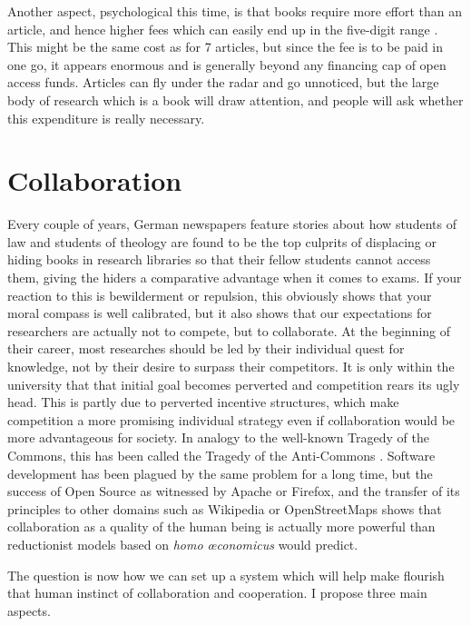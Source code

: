 \documentclass[12pt]{article}
\begin{document}
 Another aspect, psychological this time, is that books require more effort than an article, and hence higher fees which can easily end up in the five-digit range \citep{MaronEtAl2016}. This might be the same cost as for 7 articles, but since the fee is to be paid in one go, it appears enormous and is generally beyond any financing cap of open access funds. Articles can fly under the radar and go unnoticed, but the large body of research which is a book will draw attention, and people will ask whether this expenditure is really necessary. 
 
\section{Collaboration}
Every couple of years, German newspapers feature stories about how students of law and students of theology are found to be the top culprits of displacing or hiding books in research libraries so that their fellow students cannot access them, giving the hiders a comparative advantage when it comes to exams. If your reaction to this is bewilderment or repulsion, this obviously shows that your moral compass is well calibrated, but it also shows that our expectations for researchers are actually not to compete, but to collaborate. At the beginning of their career, most researches should be led by their individual quest for knowledge, not by their desire to surpass their competitors. It is only within the university that that initial goal becomes perverted and competition rears its ugly head. This is partly due to perverted incentive structures, which make competition a more promising individual strategy even if collaboration would be more advantageous for society. In analogy to the well-known Tragedy of the Commons, this has been called the Tragedy of the Anti-Commons \citep{Heller1998}. Software development has been plagued by the same problem for a long time,  but the success of Open Source as witnessed by Apache or Firefox, and the transfer of its principles to other domains such as Wikipedia or OpenStreetMaps shows that collaboration as a quality of the human being is actually more powerful than reductionist models based on \textit{homo œconomicus} would predict.

The question is now how we can set up a system which will help make flourish that human instinct of collaboration and cooperation. 
I propose three main aspects.
\end{document}
